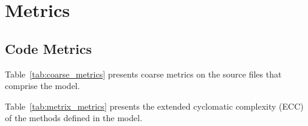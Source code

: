 \section{Metrics}\label{sec:metrics}
\subsection{Code Metrics}
Table~\ref{tab:coarse_metrics} presents coarse metrics on the source
files that comprise the model.


\newpage
Table~\ref{tab:metrix_metrics} presents the extended cyclomatic complexity
(ECC) of the methods defined in the model.


